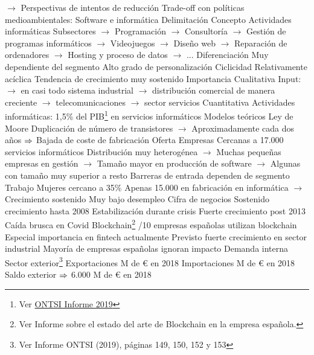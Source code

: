 \documentclass{nuevotema}
\begin{document}
\begin{esquemal}
				\4[] $\to$ Perspectivas de intentos de reducción
				\4[] Trade-off con políticas medioambientales:
		\2 Software e informática
			\3 Delimitación
				\4 Concepto
				\4[] Actividades informáticas
				\4 Subsectores
				\4[] $\to$ Programación
				\4[] $\to$ Consultoría
				\4[] $\to$ Gestión de programas informáticos
				\4[] $\to$ Videojuegos
				\4[] $\to$ Diseño web
				\4[] $\to$ Reparación de ordenadores
				\4[] $\to$ Hosting y proceso de datos
				\4[] $\to$ ...
				\4 Diferenciación
				\4[] Muy dependiente del segmento
				\4[] Alto grado de personalización
				\4 Ciclicidad
				\4[] Relativamente acíclica
				\4[] Tendencia de crecimiento muy sostenido
			\3 Importancia
				\4 Cualitativa
				\4[] Input:
				\4[] $\to$ en casi todo sistema industrial
				\4[] $\to$ distribución comercial de manera creciente
				\4[] $\to$ telecomunicaciones
				\4[] $\to$ sector servicios
				\4 Cuantitativa
				\4[] Actividades informáticas: 1,5\% del PIB\footnote{Ver \href{https://www.ontsi.red.es/es/estudios-e-informes/Sector-TIC/Informe-Anual-del-Sector-TIC-y-de-los-Contenidos-en-Espana-2019}{ONTSI Informe 2019}}
				 en servicios informáticos
			\3 Modelos teóricos
				\4 Ley de Moore
				\4[] Duplicación de número de transistores
				\4[] $\to$ Aproximadamente cada dos años
				\4[] $\Rightarrow$ Bajada de coste de fabricación
			\3 Oferta
				\4 Empresas
				\4[] Cercanas a 17.000 servicios informáticos
				\4[] Distribución muy heterogénea
				\4[] $\to$ Muchas pequeñas empresas en gestión
				\4[] $\to$ Tamaño mayor en producción de software
				\4[] $\to$ Algunas con tamaño muy superior a resto
				\4[] Barreras de entrada dependen de segmento
				\4 Trabajo
				\4[] Mujeres cercano a 35\%
				\4[] Apenas 15.000 en fabricación
				 en informática
				\4[] $\to$ Crecimiento sostenido
				\4[] Muy bajo desempleo
				\4 Cifra de negocios
				\4[] Sostenido crecimiento hasta 2008
				\4[] Estabilización durante crisis
				\4[] Fuerte crecimiento post 2013
				\4[] Caída brusca en Covid
			\3 Blockchain\footnote{Ver Informe sobre el estado del arte de Blockchain en la empresa española.}
				/10 empresas españolas utilizan blockchain
				\4 Especial importancia en fintech actualmente
				\4 Previsto fuerte crecimiento en sector industrial
				\4 Mayoría de empresas españolas ignoran impacto
			\3 Demanda interna
			\3 Sector exterior\footnote{Ver Informe ONTSI (2019), páginas 149, 150, 152 y 153}
				\4 Exportaciones
				 M de € en 2018
				\4 Importaciones
				 M de €  en 2018
				\4 Saldo exterior
				\4[] $\Rightarrow$ 6.000 M de € en 2018

\end{esquemal}
\end{document}
